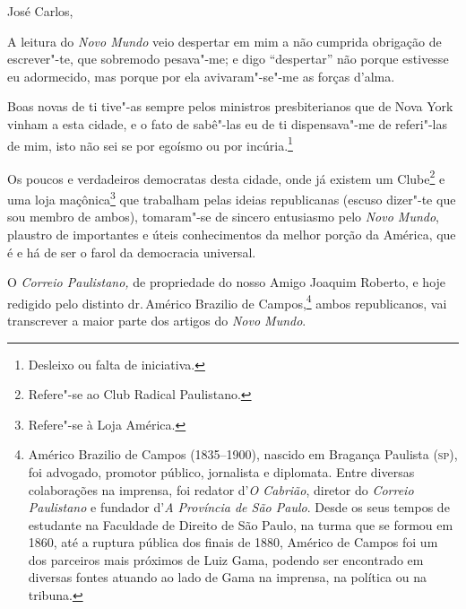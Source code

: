 \noindent{}José Carlos,\smallskip

A leitura do \emph{Novo Mundo} veio despertar em mim a não cumprida
obrigação de escrever"-te, que sobremodo pesava"-me; e digo ``despertar''
não porque estivesse eu adormecido, mas porque por ela avivaram"-se"-me as
forças d'alma.

Boas novas de ti tive"-as sempre pelos ministros presbiterianos que de
Nova York vinham a esta cidade, e o fato de sabê"-las eu de ti
dispensava"-me de referi"-las de mim, isto não sei se por egoísmo ou por
incúria.\footnote{Desleixo ou falta de iniciativa.}

Os poucos e verdadeiros democratas desta cidade, onde já existem um
Clube\footnote{Refere"-se ao Club Radical Paulistano.} e uma loja
maçônica\footnote{Refere"-se à Loja América.} que trabalham pelas
ideias republicanas (escuso dizer"-te que sou membro de ambos),
tomaram"-se de sincero entusiasmo pelo \emph{Novo Mundo}, plaustro de
importantes e úteis conhecimentos da melhor porção da América, que é e
há de ser o farol da democracia universal.

O \emph{Correio Paulistano,} de propriedade do nosso Amigo Joaquim
Roberto, e hoje redigido pelo distinto dr.\,Américo Brazilio de
Campos,\footnote{Américo Brazilio de Campos (1835--1900), nascido em
  Bragança Paulista (\textsc{sp}), foi advogado, promotor público, jornalista e
  diplomata. Entre diversas colaborações na imprensa, foi redator
  d'\emph{O Cabrião}, diretor do \emph{Correio Paulistano} e fundador
  d'\emph{A Província de São Paulo}. Desde os seus tempos de estudante
  na Faculdade de Direito de São Paulo, na turma que se formou em 1860,
  até a ruptura pública dos finais de 1880, Américo de Campos foi um dos
  parceiros mais próximos de Luiz Gama, podendo ser encontrado em
  diversas fontes atuando ao lado de Gama na imprensa, na política ou na
  tribuna.} ambos republicanos, vai transcrever a maior parte dos
artigos do \emph{Novo Mundo}.

